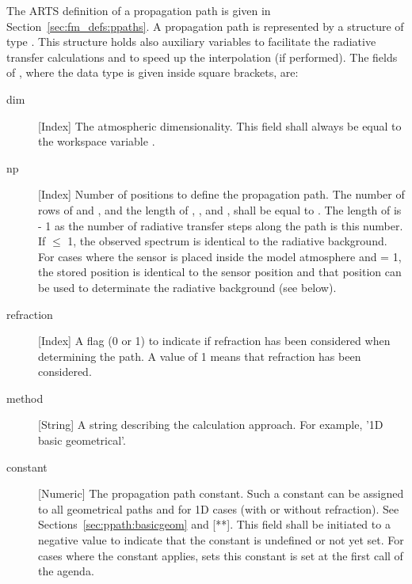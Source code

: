 The ARTS definition of a propagation path is given in
Section~\ref{sec:fm_defs:ppaths}.  A propagation path is represented
by a structure of type . This structure holds also
auxiliary variables to facilitate the radiative transfer calculations
and to speed up the interpolation (if performed). The fields of
, where the data type is given inside square
brackets, are:
\begin{description}

  \item[dim] [Index] The atmospheric dimensionality. This field shall always 
     be equal to the workspace variable .
     
   \item[np] [Index] Number of positions to define the propagation
     path. The number of rows of  and ,
     and the length of , ,
      and , shall be equal to
     . The length of  is
      - 1 as the number of radiative transfer steps along
     the path is this number. If  $\leq$ 1, the observed
     spectrum is identical to the radiative background. For cases
     where the sensor is placed inside the model atmosphere and
      = 1, the stored position is identical to the sensor
     position and that position can be used to determinate the radiative
     background (see below).

   \item[refraction] [Index] A flag (0 or 1) to indicate if refraction
     has been considered when determining the path. A value of 1 means
     that refraction has been considered.

   \item[method] [String] A string describing the calculation approach.
     For example, '1D basic geometrical'.
     
   \item[constant] [Numeric] The propagation path constant. Such a
     constant can be assigned to all geometrical paths and for 1D
     cases (with or without refraction). See
     Sections~\ref{sec:ppath:basicgeom} and [**]. This field shall be
     initiated to a negative value to indicate that the constant is
     undefined or not yet set. For cases where the constant applies,
      sets this constant is set
     at the first call of the agenda.


\end{description}
